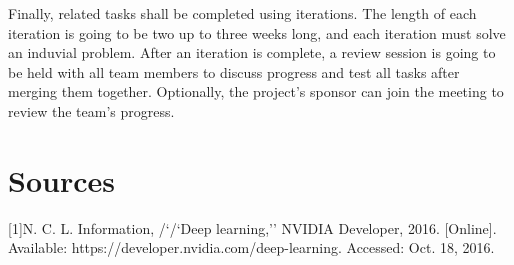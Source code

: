 \documentclass[letterpaper,10pt]{article}
\begin{document}
Finally, related tasks shall be completed using iterations. The length of each iteration is going to be two up to three weeks long, and each iteration must solve an induvial problem. After an iteration is complete, a review session is going to be held with all team members to discuss progress and test all tasks after merging them together. Optionally, the project’s sponsor can join the meeting to review the team's progress.

\section{Sources}

[1]N. C. L. Information, /`/`Deep learning,'' NVIDIA Developer, 2016. [Online]. Available: https://developer.nvidia.com/deep-learning. Accessed: Oct. 18, 2016.
\end{document}
